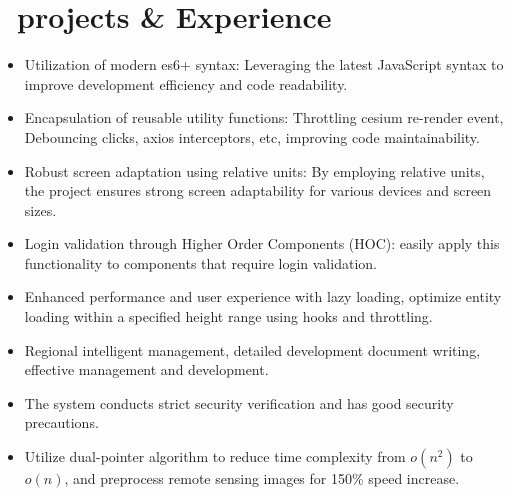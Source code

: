 \documentclass{resume}
\begin{document}
\section{\faUsers\ projects \& Experience}
\begin{itemize}
  \item Utilization of modern es6+ syntax: Leveraging the latest JavaScript syntax to improve development efficiency and code readability.
  \item Encapsulation of reusable utility functions: Throttling cesium re-render event, Debouncing clicks, axios interceptors, etc, improving code maintainability.
  \item Robust screen adaptation using relative units: By employing relative units, the project ensures strong screen adaptability for various devices and screen sizes.
  \item Login validation through Higher Order Components (HOC): easily apply this functionality to components that require login validation.
  \item Enhanced performance and user experience with lazy loading, optimize entity loading within a specified height range using hooks and throttling.
\end{itemize}

\begin{itemize}
  \item Regional intelligent management, detailed development document writing, effective management and development.
  \item The system conducts strict security verification and has good security precautions.
  \item Utilize dual-pointer algorithm to reduce time complexity from \(\mathbf{\mathit{o(n^{2})}}\) to \(\mathbf{\mathit{o(n)}}\), and preprocess remote sensing images for 150\% speed increase.
\end{itemize}
\end{document}
